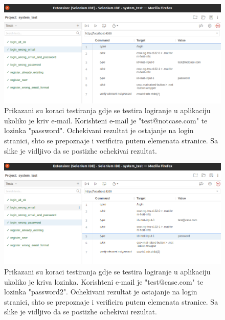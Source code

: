 {            \begin{figure}[H]
                \includegraphics[width=\textwidth]{slike/tests_system/login_wrong_email.png} %
                \caption{Prikazani su koraci testiranja gdje se testira logiranje u aplikaciju ukoliko je kriv e-mail. Korishteni e-mail je "test@notcase.com" te lozinka "password". Ochekivani rezultat je ostajanje na login stranici, shto se prepoznaje i verificira putem elemenata stranice. Sa slike je vidljivo da se postizhe ochekivai rezultat.}
                \label{fig:struktura} %
            \end{figure}

            \begin{figure}[H]
                \includegraphics[width=\textwidth]{slike/tests_system/login_wrong_password.png} %
                \caption{Prikazani su koraci testiranja gdje se testira logiranje u aplikaciju ukoliko je kriva lozinka. Korishteni e-mail je "test@case.com" te lozinka "password2". Ochekivani rezultat je ostajanje na login stranici, shto se prepoznaje i verificira putem elemenata stranice. Sa slike je vidljivo da se postizhe ochekivai rezultat.}
                \label{fig:struktura} %
            \end{figure}

}

